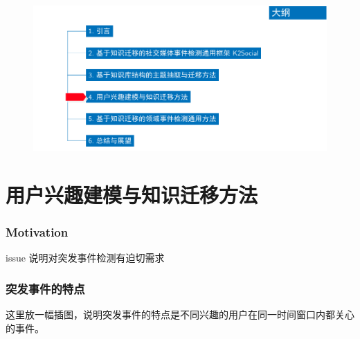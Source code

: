 \begin{withoutheadline}
\begin{frame}
\vspace*{-13mm}
\begin{figure}
	\hspace*{-4.2mm}
    \includegraphics[width=1.0\paperwidth]{img/contents4_output.pdf}
\end{figure}

\end{frame}
\end{withoutheadline}

\section{用户兴趣建模与知识迁移方法}

\begin{frame}
\frametitle{Motivation}	
issue
说明对突发事件检测有迫切需求

\end{frame}

\begin{frame}
\frametitle{突发事件的特点}
这里放一幅插图，说明突发事件的特点是不同兴趣的用户在同一时间窗口内都关心的事件。
\end{frame}

